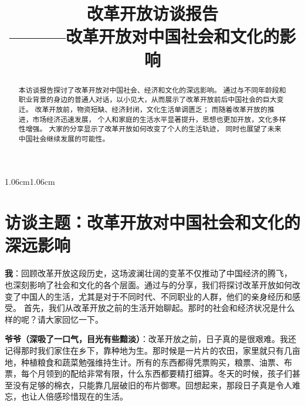 \documentclass[12pt,a4paper]{article}%
\title{
  \centering %
  \heiti %
  \fontsize{22pt}{33pt}\selectfont %
  改革开放访谈报告 \\[1em] %
  \hfill %
  \fontsize{14pt}{21pt}\selectfont %
  \fangsong %
  ———改革开放对中国社会和文化的影响 %
}
\author{
  \centering %
  \fangsong %
  \fontsize{14pt}{21pt}\selectfont %

}
\date{}%
\begin{document}
	\maketitle%
	\lhead{}%
	\chead{}%
	\rhead{}%
	\lfoot{}%
	\cfoot{\thepage}%
	\rfoot{}%

  \newpage%
	\begin{abstract}
		\fangsong 
    本访谈报告探讨了改革开放对中国社会、经济和文化的深远影响。
    通过与不同年龄段和职业背景的身边的普通人对话，以小见大，从而展示了改革开放前后中国社会的巨大变迁。
    改革开放前，物资短缺、经济封闭，文化生活单调匮乏；
    而随着改革开放的推进，市场经济迅速发展，
    个人和家庭的生活水平显著提升，思想也更加开放，文化多样性增强。
  大家的分享显示了改革开放如何改变了个人的生活轨迹，
    同时也展望了未来中国社会继续发展的可能性。
	\end{abstract}
	
	\begin{adjustwidth}{1.06cm}{1.06cm}
		\fontsize{10.5pt}{15.75pt}
		\bigskip
	\end{adjustwidth}

	\thispagestyle{empty}



\newpage%
\section*{访谈主题：改革开放对中国社会和文化的深远影响}

\textbf{我}：回顾改革开放这段历史，这场波澜壮阔的变革不仅推动了中国经济的腾飞，
也深刻影响了社会和文化的各个层面。通过与的分享，我们将探讨改革开放如何改变了中国人的生活，尤其是对于不同时代、不同职业的人群，他们的亲身经历和感受。
首先，我们从改革开放之前的生活开始聊起。那时的社会和经济状况是什么样的呢？请大家回忆一下。

\textbf{爷爷（深吸了一口气，目光有些黯淡）}：改革开放之前，日子真的是很艰难。我还记得那时我们家住在乡下，靠种地为生。那时候是一片片的农田，家里就只有几亩地，种植粮食和蔬菜勉强维持生计。所有的东西都得凭票购买，粮票、油票、布票，每个月领到的配给非常有限，什么东西都要精打细算。冬天的时候，孩子们甚至没有足够的棉衣，只能靠几层破旧的布片御寒。回想起来，那段日子真是令人难忘，也让人倍感珍惜现在的生活。
\end{document}
